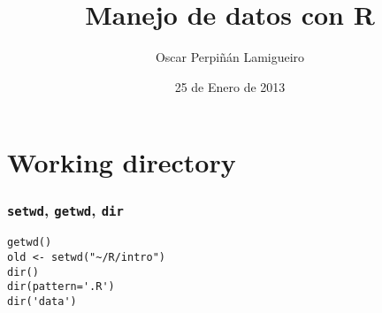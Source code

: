 \documentclass{beamer}
\title{Manejo de datos con R}
\author{Oscar Perpiñán Lamigueiro}
\date{25 de Enero de 2013}
\begin{document}
\maketitle



\section{Working directory}
\label{sec-1}
\begin{frame}[fragile]
\frametitle{\texttt{setwd}, \texttt{getwd}, \texttt{dir}}
\label{sec-1-1}


\lstset{language=R}
\begin{lstlisting}
getwd()
old <- setwd("~/R/intro")
dir()
dir(pattern='.R')
dir('data')
\end{lstlisting}
\end{frame}
\end{document}
